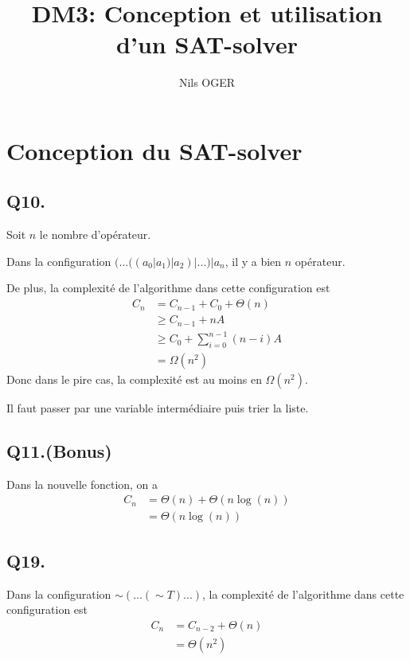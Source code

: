 

\title{DM3: Conception et utilisation d’un SAT-solver}
\author{Nils OGER}
\date{}


    \maketitle
    \section{Conception du SAT-solver}
    \subsection*{Q10.}
    Soit $n$ le nombre d'opérateur.

    Dans la configuration $(...((a_0 | a_1) | a_2) | ...) | a_n$,
    il y a bien $n$ opérateur.

    De plus, la complexité de l'algorithme dans cette configuration est
    \begin{align*}
        C_n &= C_{n-1} + C_0 + \Theta(n)\\
        &\geq C_{n-1} + nA\\
        &\geq C_0 + \sum_{i=0}^{n-1}(n-i)A\\
        &= \Omega(n^2)
    \end{align*}
    Donc dans le pire cas, la complexité est au moins en $\Omega(n^2)$.

    Il faut passer par une variable intermédiaire puis trier la liste.

    \subsection*{Q11.(Bonus)}
    Dans la nouvelle fonction, on a
    \begin{align*}
        C_n &= \Theta(n) + \Theta(n\log(n))\\
        &= \Theta(n\log(n))
    \end{align*}

    \subsection*{Q19.}
    Dans la configuration $\sim(...(\sim T)...)$, 
    la complexité de l'algorithme dans cette configuration est
    \begin{align*}
        C_n &= C_{n-2} + \Theta(n)\\
        &= \Theta(n^2)
    \end{align*}

